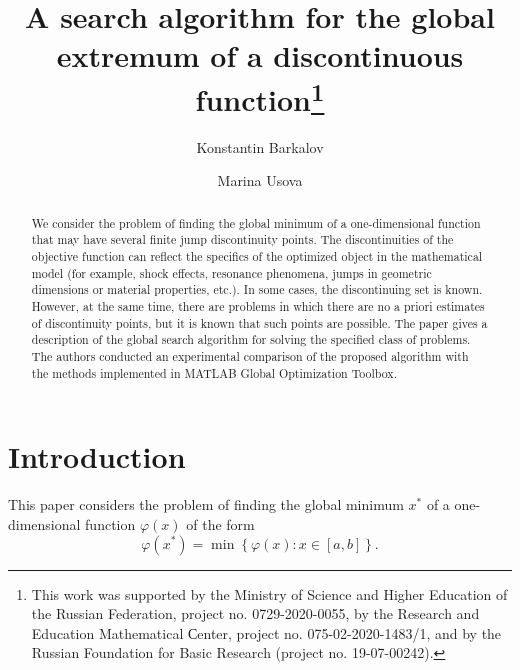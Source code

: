 \documentclass[runningheads]{llncs}
\begin{document}
%
\title{A search algorithm for the global extremum \break of a discontinuous function\thanks{This work was supported by the Ministry of Science and Higher Education of the Russian Federation, project no. 0729-2020-0055, by the Research and Education Mathematical Сenter, project no. 075-02-2020-1483/1, and by the Russian Foundation for Basic Research (project no. 19-07-00242).} }
%
%
\author{Konstantin Barkalov   
\and Marina Usova 
}
%
%
%
\maketitle              %
%
\begin{abstract}
We consider the problem of finding the global minimum of a one-dimensional function that may have several finite jump discontinuity points. The discontinuities of the objective function can reflect the specifics of the optimized object in the mathematical model (for example, shock effects, resonance phenomena, jumps in geometric dimensions or material properties, etc.). In some cases, the discontinuing set is known. However, at the same time, there are problems in which there are no a priori estimates of discontinuity points, but it is known that such points are possible. The paper gives a description of the global search algorithm for solving the specified class of problems. The authors conducted an experimental comparison of the proposed algorithm with the methods implemented in MATLAB Global Optimization Toolbox.


\end{abstract}
%
%
%
\section{Introduction}

This paper considers the problem of finding the global minimum $x^*$ of a one-dimensional function $\varphi(x)$ of the form 
\begin{equation}\label{problem}
\varphi(x^*)=\min\left\{\varphi(x):x\in\left[a,b\right]\right\}.
\end{equation}
\end{document}
